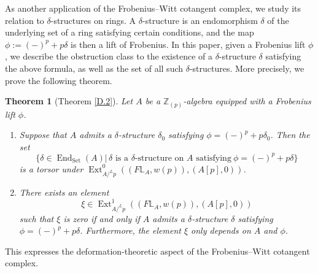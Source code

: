 \documentclass[11pt, a4paper]{amsart}
\theoremstyle{plain}
\newtheorem{theorem}{Theorem}[section]
\theoremstyle{definition}
\begin{document}
As another application of the Frobenius--Witt cotangent complex, we study its relation to $\delta$-structures on rings. A $\delta$-structure is an endomorphism $\delta$ of the underlying set of a ring satisfying certain conditions, and the map $\phi := (-)^p + p\delta$ is then a lift of Frobenius. In this paper, given a Frobenius lift $\phi$, we describe the obstruction class to the existence of a $\delta$-structure $\delta$ satisfying the above formula, as well as the set of all such $\delta$-structures. More precisely, we prove the following theorem.
\begin{theorem}[Theorem \ref{D.2}]
    Let $A$ be a $\mathbb Z_{(p)}$-algebra equipped with a Frobenius lift $\phi$.
\begin{enumerate}
\item Suppose that $A$ admits a $\delta$-structure $\delta_0$ satisfying $\phi = (-)^p + p\delta_0$.
Then the set
\[\{\delta\in \operatorname{End}_{\operatorname{Set}}(A)|\,\delta \text{ is a }\delta\text{-structure on }A \text{ satisfying} \ \phi=(-)^p+p\delta\}\]
is a torsor under $\operatorname{Ext}^0_{A/^Lp}((F\mathbb L_A,w(p)),(A[p],0))$.

\item There exists an element
\[\xi\in \operatorname{Ext}^1_{A/^Lp}((F\mathbb L_A,w(p)),(A[p],0))\]
such that $\xi$ is zero if and only if $A$ admits a $\delta$-structure $\delta$ satisfying $\phi=(-)^p+p\delta$. Furthermore, the element $\xi$ only depends on $A$ and $\phi$.
\end{enumerate}
\end{theorem}
This expresses the deformation-theoretic aspect of the Frobenius--Witt cotangent complex.
\end{document}
